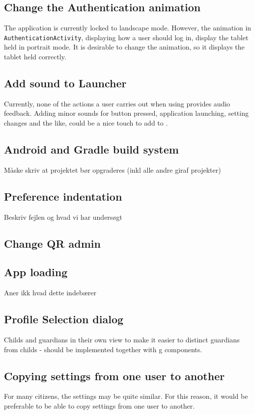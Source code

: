 \subsection{Change the Authentication animation}
The application is currently locked to landscape mode.
However, the animation in \lstinline!AuthenticationActivity!, displaying how a user should log in, display the tablet held in portrait mode.
It is desirable to change the animation, so it displays the tablet held correctly.

\subsection{Add sound to Launcher}
Currently, none of the actions a user carries out when using \launcher provides audio feedback.
Adding minor sounds for button pressed, application launching, setting changes and the like, could be a nice touch to add to \launcher. 

\subsection{Android and Gradle build system}
Måske skriv at projektet bør opgraderes (inkl alle andre giraf projekter)

\subsection{Preference indentation}
Beskriv fejlen og hvad vi har undersøgt

\subsection{Change QR admin}

\subsection{App loading}
Aner ikk hvad dette indebærer

\subsection{Profile Selection dialog}
Childs and guardians in their own view to make it easier to distinct guardians from childs - should be implemented together with g components.

\subsection{Copying settings from one user to another}
For many citizens, the settings may be quite similar.
For this reason, it would be preferable to be able to copy settings from one user to another.
